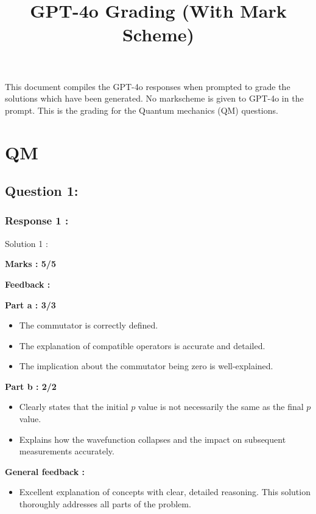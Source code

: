 \documentclass[a4paper,11pt]{article}
\title{GPT-4o Grading (With Mark Scheme)}
\begin{document}
\maketitle
This document compiles the GPT-4o responses when prompted to grade the solutions which have been generated. No markscheme is given to GPT-4o in the prompt. This is the grading for the Quantum mechanics (QM) questions.

\section{QM}

\subsection*{Question 1:}

\subsubsection*{Response 1 :}

Solution 1 :

\textbf{Marks : 5/5}

\textbf{Feedback : }

\textbf{Part a : 3/3}

\begin{itemize}
    \item The commutator is correctly defined.
    \item The explanation of compatible operators is accurate and detailed.
    \item The implication about the commutator being zero is well-explained.
\end{itemize}

\textbf{Part b : 2/2}

\begin{itemize}
    \item Clearly states that the initial $p$ value is not necessarily the same as the final $p$ value.
    \item Explains how the wavefunction collapses and the impact on subsequent measurements accurately.
\end{itemize}

\textbf{General feedback :}

\begin{itemize}
    \item Excellent explanation of concepts with clear, detailed reasoning. This solution thoroughly addresses all parts of the problem.
\end{itemize}
\end{document}
